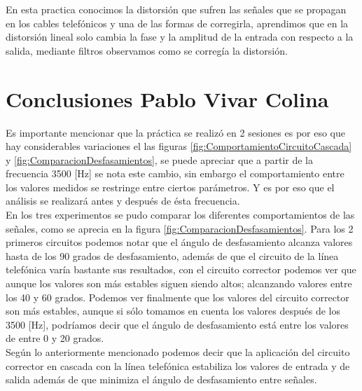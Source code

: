 \documentclass{article}
\begin{document}
En esta practica conocimos la distorsión que sufren las señales que se propagan en los cables telefónicos y una de las formas de corregirla, aprendimos que en la distorsión lineal solo cambia la fase y la amplitud de la entrada con respecto a la salida, mediante filtros observamos como se corregía la distorsión.

\section{Conclusiones Pablo Vivar Colina}

Es importante mencionar que la práctica se realizó en 2 sesiones es por eso que hay considerables variaciones el las figuras \ref{fig:ComportamientoCircuitoCascada} y \ref{fig:ComparacionDesfasamientos}, se puede apreciar que a partir de la frecuencia 3500 [Hz] se nota este cambio, sin embargo el comportamiento entre los valores medidos se restringe entre ciertos parámetros. Y es por eso que el análisis se realizará antes y después de ésta frecuencia.\\

En los tres experimentos se pudo comparar los diferentes comportamientos de las señales, como se aprecia en la figura \ref{fig:ComparacionDesfasamientos}. Para los 2 primeros circuitos podemos notar que el ángulo de desfasamiento alcanza valores hasta de los 90 grados de desfasamiento, además de que el circuito de la línea telefónica varía bastante sus resultados, con el circuito corrector podemos ver que aunque los valores son más estables siguen siendo altos; alcanzando valores entre los 40 y 60 grados. Podemos ver finalmente que los valores del circuito corrector son más estables, aunque si sólo tomamos en cuenta los valores después de los 3500 [Hz], podríamos decir que el ángulo de desfasamiento está entre los valores de entre 0 y 20 grados.\\

Según lo anteriormente mencionado podemos decir que la aplicación del circuito corrector en cascada con la línea telefónica estabiliza los valores de entrada y de salida además de que minimiza el ángulo de desfasamiento entre señales.\\[10cm]
\end{document}
